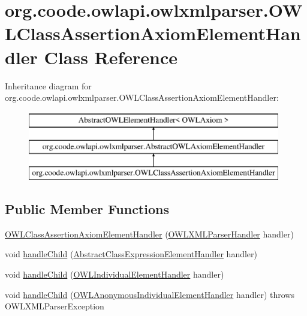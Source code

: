 \hypertarget{classorg_1_1coode_1_1owlapi_1_1owlxmlparser_1_1_o_w_l_class_assertion_axiom_element_handler}{\section{org.\-coode.\-owlapi.\-owlxmlparser.\-O\-W\-L\-Class\-Assertion\-Axiom\-Element\-Handler Class Reference}
\label{classorg_1_1coode_1_1owlapi_1_1owlxmlparser_1_1_o_w_l_class_assertion_axiom_element_handler}
}
Inheritance diagram for org.\-coode.\-owlapi.\-owlxmlparser.\-O\-W\-L\-Class\-Assertion\-Axiom\-Element\-Handler\-:\begin{figure}[H]
\begin{center}
\leavevmode
\includegraphics[height=3.000000cm]{classorg_1_1coode_1_1owlapi_1_1owlxmlparser_1_1_o_w_l_class_assertion_axiom_element_handler}
\end{center}
\end{figure}
\subsection*{Public Member Functions}
\begin{DoxyCompactItemize}
\item 
\hyperlink{classorg_1_1coode_1_1owlapi_1_1owlxmlparser_1_1_o_w_l_class_assertion_axiom_element_handler_ad86f70b66ec5dec31354c72a0ca046a4}{O\-W\-L\-Class\-Assertion\-Axiom\-Element\-Handler} (\hyperlink{classorg_1_1coode_1_1owlapi_1_1owlxmlparser_1_1_o_w_l_x_m_l_parser_handler}{O\-W\-L\-X\-M\-L\-Parser\-Handler} handler)
\item 
void \hyperlink{classorg_1_1coode_1_1owlapi_1_1owlxmlparser_1_1_o_w_l_class_assertion_axiom_element_handler_aceb41cb0e523771a562925b82988e890}{handle\-Child} (\hyperlink{classorg_1_1coode_1_1owlapi_1_1owlxmlparser_1_1_abstract_class_expression_element_handler}{Abstract\-Class\-Expression\-Element\-Handler} handler)
\item 
void \hyperlink{classorg_1_1coode_1_1owlapi_1_1owlxmlparser_1_1_o_w_l_class_assertion_axiom_element_handler_ad0cdf5b54b2c6c1d6ccfb71f5c023049}{handle\-Child} (\hyperlink{classorg_1_1coode_1_1owlapi_1_1owlxmlparser_1_1_o_w_l_individual_element_handler}{O\-W\-L\-Individual\-Element\-Handler} handler)
\item 
void \hyperlink{classorg_1_1coode_1_1owlapi_1_1owlxmlparser_1_1_o_w_l_class_assertion_axiom_element_handler_a58f3f6ab67a06a323456b5de9618356f}{handle\-Child} (\hyperlink{classorg_1_1coode_1_1owlapi_1_1owlxmlparser_1_1_o_w_l_anonymous_individual_element_handler}{O\-W\-L\-Anonymous\-Individual\-Element\-Handler} handler)  throws O\-W\-L\-X\-M\-L\-Parser\-Exception 
\end{DoxyCompactItemize}
